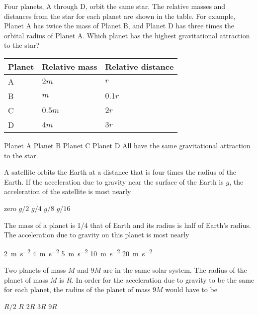 \documentclass{../../../oss-ap12ibhl}
\begin{document}
\begin{questions}
  \question Four planets, A through D, orbit the same star. The relative masses
  and distances from the star for each planet are shown in the table. For
  example, Planet A has twice the mass of Planet B, and Planet D has three
  times the orbital radius of Planet A. Which planet has the highest
  gravitational attraction to the star?
  \begin{center}
    \vspace{-.1in}
    \begin{tabular}{lll}
      \hline
      \textbf{Planet} & \textbf{Relative mass} & \textbf{Relative distance}\\
      \hline
      A\hspace{.4in}& $2m$     & $r$    \\ \hline
      B & $m$                  & $0.1r$\hspace{.25in} \\ \hline
      C & $0.5m$\hspace{.25in} & $2r$   \\ \hline
      D & $4m$                 & $3r$   \\ \hline
    \end{tabular}
  \end{center}
  \begin{choices}
    \choice Planet A
    \choice Planet B
    \choice Planet C
    \choice Planet D
    \choice All have the same gravitational attraction to the star.
  \end{choices}

  \question A satellite orbits the Earth at a distance that is four times the
  radius of the Earth. If the acceleration due to gravity near the surface of
  the Earth is $g$, the acceleration of the satellite is most nearly
  \begin{choices}
    \choice zero
    \choice $g/2$
    \choice $g/4$
    \choice $g/8$
    \choice $g/16$
  \end{choices}

  \question The mass of a planet is 1/4 that of Earth and its radius is half of
  Earth's radius. The acceleration due to gravity on this planet is most nearly
  \begin{choices}
    \choice\SI{2}{\metre\per\second\squared}
    \choice\SI{4}{\metre\per\second\squared}
    \choice\SI{5}{\metre\per\second\squared}
    \choice\SI{10}{\metre\per\second\squared}
    \choice\SI{20}{\metre\per\second\squared}
  \end{choices}
  
  \question Two planets of mass $M$ and $9M$ are in the same solar system. The
  radius of the planet of mass $M$ is $R$. In order for the acceleration due
  to gravity to be the same for each planet, the radius of the planet of mass
  $9M$ would have to be
  \begin{choices}
    \choice $R/2$
    \choice $R$
    \choice $2R$
    \choice $3R$
    \choice $9R$
  \end{choices}
  \newpage
  

\end{questions}
\end{document}
